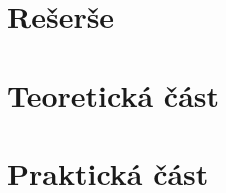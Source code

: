 \documentclass{ctuthesis}
\begin{document}
\maketitle


\printglossary[title=Seznam použitých symbolů]



\part{Rešerše}





\part{Teoretická část}








\part{Praktická část}










\appendix


\end{document}
